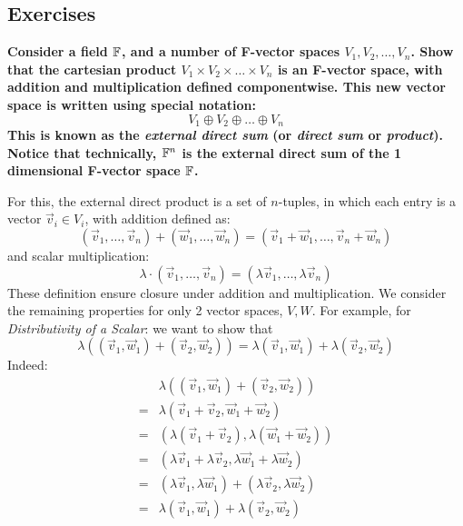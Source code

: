 \documentclass{exam}
\begin{document}
\subsection{Exercises}

\begin{questions}

\question \textbf{Consider a field $\mathbb{F}$, and a number of F-vector spaces $V_1, V_2, \ldots, V_n$. Show that the cartesian product $V_1 \times V_2 \times \ldots \times V_n$ is an F-vector space, with addition and multiplication defined componentwise. This new vector space is written using special notation:}
\[
V_1 \oplus V_2 \oplus \ldots \oplus V_n
\]
\textbf{This is known as the \textit{external direct sum} (or \textit{direct sum} or \textit{product}). Notice that technically, $\mathbb{F}^n$ is the external direct sum of the 1 dimensional F-vector space $\mathbb{F}$.}

\bigskip

For this, the external direct product is a set of $n$-tuples, in which each entry is a vector $\vec{v}_i \in V_i$, with addition defined as:
\[
(\vec{v}_1, \ldots, \vec{v}_n) + (\vec{w}_1, \ldots, \vec{w}_n) = (\vec{v}_1 + \vec{w}_1, \ldots, \vec{v}_n + \vec{w}_n)
\]
and scalar multiplication:
\[
\lambda \cdot (\vec{v}_1, \ldots, \vec{v}_n) = (\lambda\vec{v}_1, \ldots, \lambda\vec{v}_n) 
\]
These definition ensure closure under addition and multiplication. We consider the remaining properties for only 2 vector spaces, $V,W$. For example, for \textit{Distributivity of a Scalar}: we want to show that
    \[
    \lambda((\vec{v}_1 , \vec{w}_1 ) + (\vec{v}_2, \vec{w}_2)) = \lambda(\vec{v}_1 ,\vec{w}_1 ) + \lambda(\vec{v}_2, \vec{w}_2)
    \]
    Indeed:
    \begin{align*}
        &\lambda((\vec{v}_1 , \vec{w}_1 ) + (\vec{v}_2, \vec{w}_2)) \\
        =&\lambda(\vec{v}_1  + \vec{v}_2, \vec{w}_1  + \vec{w}_2) \\
        =&(\lambda(\vec{v}_1  + \vec{v}_2), \lambda(\vec{w}_1  + \vec{w}_2)) \\
        =&(\lambda \vec{v}_1  + \lambda \vec{v}_2, \lambda \vec{w}_1  + \lambda  \vec{w}_2) \\
        =&(\lambda \vec{v}_1 , \lambda \vec{w}_1 ) + (\lambda \vec{v}_2, \lambda  \vec{w}_2) \\
        =&\lambda (\vec{v}_1 , \vec{w}_1 ) + \lambda (\vec{v}_2, \vec{w}_2) \\
    \end{align*}


\end{questions}
\end{document}

